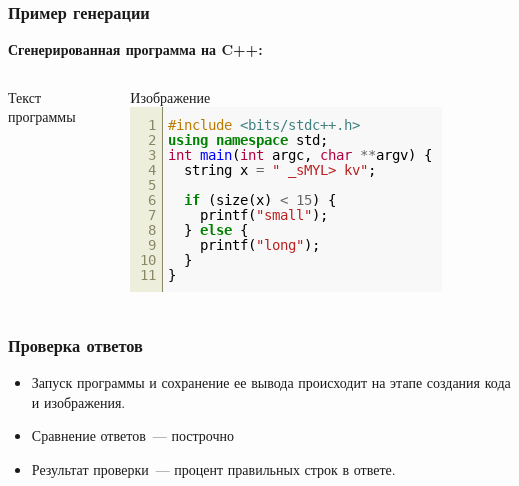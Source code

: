 \documentclass[14pt,aspectratio=169,hyperref={pdftex,unicode},xcolor=dvipsnames]{beamer}
\begin{document}
\begin{frame}[fragile]
    \frametitle{Пример генерации}
    \textbf{Сгенерированная программа на C++:}\\
    \begin{columns}
        \begin{column}{0.45\textwidth}
            Текст программы
        \end{column}
        \begin{column}{0.45\textwidth}
            Изображение
            \includegraphics[width=\textwidth]{images/code_image_cpp.png}
        \end{column}

    \end{columns}
\end{frame}


\begin{frame}
    \frametitle{Проверка ответов}
    \begin{itemize}
        \item Запуск программы и сохранение ее вывода происходит на этапе создания кода и изображения.
        \item Сравнение ответов~--- построчно
        \item Результат проверки~--- процент правильных строк в ответе.
    \end{itemize}
\end{frame}

\end{document}
